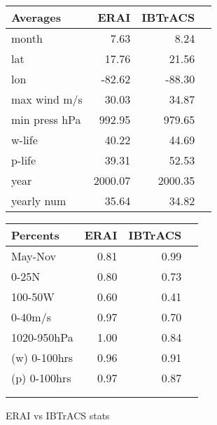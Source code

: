 \begin{figure}[!tbp]
\centering
\begin{minipage}[b]{0.45\textwidth}
\begin{tabular}{lrrr}
\toprule
             Averages &         ERAI &      IBTrACS \\ 
\midrule
            month &     7.63 &     8.24 \\  
              lat &    17.76 &    21.56 \\    
              lon &   -82.62 &   -88.30 \\    
     max wind m/s &    30.03 &    34.87 \\    
    min press hPa &   992.95 &   979.65 \\    
           w-life &    40.22 &    44.69 \\    
           p-life &    39.31 &    52.53 \\    
             year &     2000.07 &  2000.35 \\
       yearly num &    35.64 &    34.82 \\   
\bottomrule
\end{tabular}
\end{minipage}
\hfill
\begin{minipage}[b]{0.45\textwidth}
\begin{tabular}{lrrr}
\toprule
             Percents &         ERAI &      IBTrACS \\ 
\midrule


             May-Nov &     0.81 &     0.99 \\    
               0-25N &     0.80 &     0.73 \\   
             100-50W &     0.60 &     0.41 \\   
             0-40m/s &     0.97 &     0.70 \\   
         1020-950hPa &     1.00 &     0.84 \\   
        (w) 0-100hrs &     0.96 &     0.91 \\   
        (p) 0-100hrs &     0.97 &     0.87 \\
 \\
 \\

\bottomrule
\end{tabular}
\end{minipage}

\noindent{}
\caption{ERAI vs IBTrACS stats}
\label{evi_table}
\end{figure}

